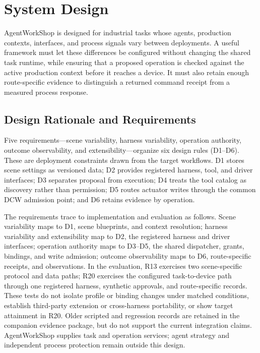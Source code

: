 \section{System Design}
\label{sec:design}
AgentWorkShop is designed for industrial tasks whose agents, production
contexts, interfaces, and process signals vary between deployments. A useful
framework must let these differences be configured without changing the
shared task runtime, while ensuring that a proposed operation is checked
against the active production context before it reaches a device. It must also
retain enough route-specific evidence to distinguish a returned command
receipt from a measured process response.

\subsection{Design Rationale and Requirements}
\label{sec:principles}
Five requirements---scene variability, harness variability, operation
authority, outcome observability, and extensibility---organize six design
rules (D1--D6). These are deployment constraints drawn from the target
workflows. D1 stores scene settings as versioned data;
D2 provides registered harness, tool, and driver interfaces; D3 separates
proposal from execution; D4 treats the tool catalog as discovery rather than
permission; D5 routes actuator writes through the common DCW admission point;
and D6 retains evidence by operation.

The requirements trace to implementation and evaluation as follows.
Scene variability maps to D1, scene blueprints, and context resolution;
harness variability and extensibility map to D2, the registered harness and
driver interfaces; operation authority maps to D3--D5, the shared dispatcher,
grants, bindings, and write admission; outcome observability maps to D6,
route-specific receipts, and observations. In the evaluation, R13 exercises
two scene-specific protocol and data paths; R20 exercises the configured
task-to-device path through one registered harness, synthetic approvals, and
route-specific records. These tests do not isolate profile or binding changes
under matched conditions, establish third-party extension or cross-harness
portability, or show target attainment in R20. Older scripted and regression
records are retained in the companion evidence package, but do not support
the current integration claims. AgentWorkShop supplies task and operation
services; agent strategy and independent process protection remain outside
this design.

